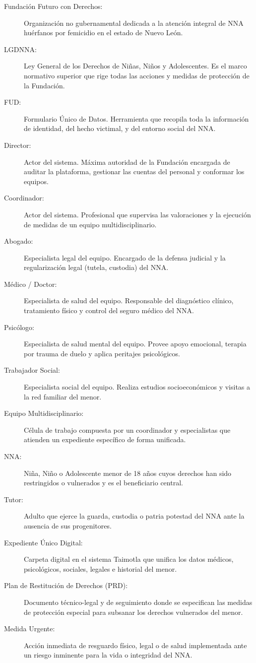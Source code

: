 \begin{description}
	\item[\hypertarget{tFundacion}{Fundación Futuro con Derechos:}] Organización no gubernamental dedicada a la atención integral de NNA huérfanos por femicidio en el estado de Nuevo León.
	\item[\hypertarget{tLGDNNA}{LGDNNA:}] Ley General de los Derechos de Niñas, Niños y Adolescentes. Es el marco normativo superior que rige todas las acciones y medidas de protección de la Fundación.
	\item[\hypertarget{tFUD}{FUD:}] Formulario Único de Datos. Herramienta que recopila toda la información de identidad, del hecho victimal, y del entorno social del NNA.
	\item[\hypertarget{tDirector}{Director:}] Actor del sistema. Máxima autoridad de la Fundación encargada de auditar la plataforma, gestionar las cuentas del personal y conformar los equipos.
	\item[\hypertarget{tCoordinador}{Coordinador:}] Actor del sistema. Profesional que supervisa las valoraciones y la ejecución de medidas de un equipo multidisciplinario.
	\item[\hypertarget{tAbogado}{Abogado:}] Especialista legal del equipo. Encargado de la defensa judicial y la regularización legal (tutela, custodia) del NNA.
	\item[\hypertarget{tMedico}{Médico / Doctor:}] Especialista de salud del equipo. Responsable del diagnóstico clínico, tratamiento físico y control del seguro médico del NNA.
	\item[\hypertarget{tPsicologo}{Psicólogo:}] Especialista de salud mental del equipo. Provee apoyo emocional, terapia por trauma de duelo y aplica peritajes psicológicos.
	\item[\hypertarget{tTSocial}{Trabajador Social:}] Especialista social del equipo. Realiza estudios socioeconómicos y visitas a la red familiar del menor.
	\item[\hypertarget{tEquipo}{Equipo Multidisciplinario:}] Célula de trabajo compuesta por un coordinador y especialistas que atienden un expediente específico de forma unificada.
	\item[\hypertarget{tNNA}{NNA:}] Niña, Niño o Adolescente menor de 18 años cuyos derechos han sido restringidos o vulnerados y es el beneficiario central.
	\item[\hypertarget{tTutor}{Tutor:}] Adulto que ejerce la guarda, custodia o patria potestad del NNA ante la ausencia de sus progenitores.
	\item[\hypertarget{tExpediente}{Expediente Único Digital:}] Carpeta digital en el sistema Taimotla que unifica los datos médicos, psicológicos, sociales, legales e historial del menor.
	\item[\hypertarget{tPRD}{Plan de Restitución de Derechos (PRD):}] Documento técnico-legal y de seguimiento donde se especifican las medidas de protección especial para subsanar los derechos vulnerados del menor.
	\item[\hypertarget{tMedidaUrgente}{Medida Urgente:}] Acción inmediata de resguardo físico, legal o de salud implementada ante un riesgo inminente para la vida o integridad del NNA.
\end{description}

